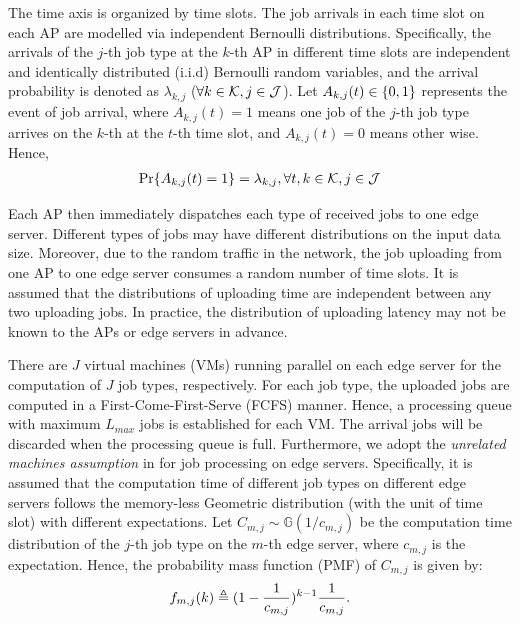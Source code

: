 The time axis is organized by time slots.
The job arrivals in each time slot on each AP are modelled via independent Bernoulli distributions.
Specifically, the arrivals of the $j$-th job type at the $k$-th AP in different time slots are independent and identically distributed (i.i.d) Bernoulli random variables, and the arrival probability is denoted as $\lambda_{k,j}$ ($\forall k\in\mathcal{K}, j\in\mathcal{J}$).
Let $A_{k,j}(t) \in \{0,1\}$ represents the event of job arrival, where $A_{k,j}(t)=1$ means one job of the $j$-th job type arrives on the $k$-th at the $t$-th time slot, and $A_{k,j}(t)=0$ means other wise.
Hence,
\begin{align}
    \Pr\{ A_{k,j}(t) = 1 \} = \lambda_{k,j}, \forall t,k\in\mathcal{K},j\in\mathcal{J}
\end{align}

Each AP then immediately dispatches each type of received jobs to one edge server.
Different types of jobs may have different distributions on the input data size.
Moreover, due to the random traffic in the network, the job uploading from one AP to one edge server consumes a random number of time slots.
It is assumed that the distributions of uploading time are independent between any two uploading jobs.
In practice, the distribution of uploading latency may not be known to the APs or edge servers in advance.

There are $J$ virtual machines (VMs) running parallel on each edge server for the computation of $J$ job types, respectively.
For each job type, the uploaded jobs are computed in a First-Come-First-Serve (FCFS) manner.
Hence, a processing queue with maximum $L_{max}$ jobs is established for each VM.
The arrival jobs will be discarded when the processing queue is full.
Furthermore, we adopt the \emph{unrelated machines assumption} in \cite{tan-online} for job processing on edge servers.
Specifically, it is assumed that the computation time of different job types on different edge servers follows the memory-less Geometric distribution (with the unit of time slot) with different expectations.
Let $C_{m,j} \sim \mathbb{G}(1/c_{m,j})$ be the computation time distribution of the $j$-th job type on the $m$-th edge server, where $c_{m,j}$ is the expectation.
Hence, the probability mass function (PMF) of $C_{m,j}$ is given by:
\begin{align}
    f_{m,j}(k) \triangleq (1-\frac{1}{c_{m,j}})^{k-1} \frac{1}{c_{m,j}}.
\end{align}

